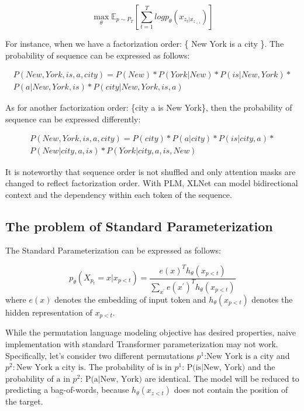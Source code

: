 \documentclass[]{krantz}
\begin{document}
\begin{equation}
\max_{\theta} \mathbb{E}_{p\sim P_T} \left[\sum_{t=1}^Tlogp_{\theta}(x_{z_t|x_{z_{<t}}})\right]
\end{equation}

For instance, when we have a factorization order: \{ New York is a city \}. The probability of sequence can be expressed as follows:

\begin{equation}
\begin{aligned}
P(New, York, is, a, city) = P(New) * P(York | New) * P(is | New, York) * \\  P(a | New, York, is) * P(city | New, York, is, a)
\end{aligned}
\end{equation}

As for another factorization order: \{city a is New York\}, then the probability of sequence can be expressed differently:

\begin{equation}
\begin{aligned}
P(New, York, is, a, city) = P(city) * P(a | city) * P(is | city, a) * \\ P(New | city, a, is) * P(York | city, a, is, New)
\end{aligned}
\end{equation}

It is noteworthy that sequence order is not shuffled and only attention masks are changed to reflect factorization order. With PLM, XLNet can model bidirectional context and the dependency within each token of the sequence.

\hypertarget{the-problem-of-standard-parameterization}{%
\subsection{The problem of Standard Parameterization}\label{the-problem-of-standard-parameterization}}

The Standard Parameterization can be expressed as follows:

\[p_{\theta}(X_{p_t}=x|x_{p<t})=\frac{e(x)^Th_{\theta}(x_{p<t})}{\sum_{x^{'}}e(x^{'})^Th_{\theta}(x_{p<t})}\]
where \(e(x)\) denotes the embedding of input token and \(h_{\theta}(x_{p<t})\) denotes the hidden representation of \(x_{p<t}\).

While the permutation language modeling objective has desired properties, naive implementation with standard Transformer parameterization may not work. Specifically, let's consider two different permutations \(p^1\text{:{New York is a city}}\) and \(p^2:\text{{New York a city is}}\). The probability of \(\text{{is}}\) in \(p^1\): \(\text{P(is|New, York)}\) and the probability of \(\text{{a}}\) in \(p^2\): \(\text{P(a|New, York)}\) are identical. The model will be reduced to predicting a bag-of-words, because \(h_{\theta}(x_{z<t})\) does not contain the position of the target.
\end{document}
